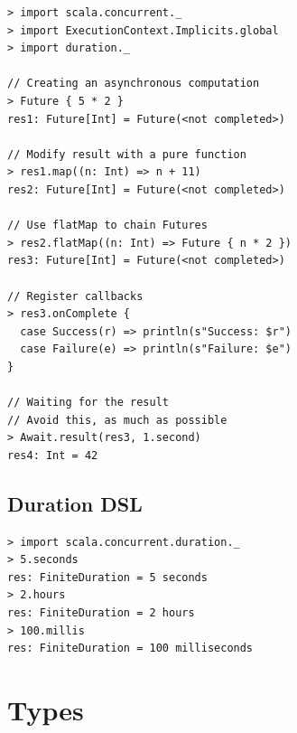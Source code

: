 \documentclass[10pt,landscape,a4paper]{article}
\begin{document}
\begin{multicols*}{4}
\begin{verbatim}
> import scala.concurrent._
> import ExecutionContext.Implicits.global
> import duration._

// Creating an asynchronous computation
> Future { 5 * 2 }
res1: Future[Int] = Future(<not completed>)

// Modify result with a pure function
> res1.map((n: Int) => n + 11)
res2: Future[Int] = Future(<not completed>)

// Use flatMap to chain Futures
> res2.flatMap((n: Int) => Future { n * 2 })
res3: Future[Int] = Future(<not completed>)

// Register callbacks
> res3.onComplete {
  case Success(r) => println(s"Success: $r")
  case Failure(e) => println(s"Failure: $e")
}

// Waiting for the result
// Avoid this, as much as possible
> Await.result(res3, 1.second)
res4: Int = 42
\end{verbatim}
  \subsection{Duration DSL}

\begin{verbatim}
> import scala.concurrent.duration._
> 5.seconds
res: FiniteDuration = 5 seconds
> 2.hours
res: FiniteDuration = 2 hours
> 100.millis
res: FiniteDuration = 100 milliseconds
\end{verbatim}

  \section{Types}

  \begin{center}
  \end{center}


\end{multicols*}
\end{document}
